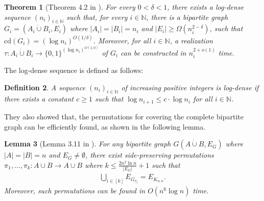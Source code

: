 \documentclass[10pt,a4paper]{article}
\newtheorem{theorem}{Theorem}
\newtheorem{lemma}[theorem]{Lemma}
\newtheorem{definition}[theorem]{Definition}
\newcommand{\N}{\mathbb{N}}
\begin{document}
\begin{theorem}[Theorem 4.2 in \cite{r29}] \label{thm:dense-cd}
For every $0<\delta < 1$, there exists a log-dense sequence $(n_i)_{i\in \N}$ such that, for every $i\in \N$, there is a bipartite graph $G_i=(A_i \dot \cup B_i, E_i)$ where $|A_i|=|B_i|=n_i$ and $|E_i|\ge \Omega(n_i^{2-\delta})$, such that $\mathrm{cd}(G_i)=(\log n_i)^{O(1/\delta)}$. Moreover, for all $i\in \N$, a realization $\tau:A_i\dot \cup B_i\rightarrow \{0,1\}^{(\log n_i)^{O(1/\delta)}}$ of $G_i$ can be constructed in $n_i^{2+o(1)}$ time.
\end{theorem}
\noindent The log-dense sequence is defined as follows:
\begin{definition}
A sequence $(n_i)_{i\in \N}$ of increasing positive integers is log-dense if there exists a constant $c\ge 1$ such that $\log n_{i+1}\le c\cdot \log n_i$ for all $i\in \N$.
\end{definition}
They also showed that, the permutations for covering the complete bipartite graph can be efficiently found, as shown in the following lemma.
\begin{lemma}[Lemma 3.11 in \cite{r29}] \label{lem:cover}
For any bipartite graph $G(A\dot \cup B, E_G)$ where $|A|=|B|=n$ and $E_G\ne \emptyset$, there exist side-preserving permutations $\pi_1,\dots, \pi_k:A\cup B\rightarrow A\cup B$ where $k\leq \frac{2n^2\ln n}{|E_G|}+1$ such that
\begin{align}
    \underset{i\in [k]}{\bigcup} E_{G_{\pi_i}} = E_{K_{n,n}}.
\end{align}
Moreover, such permutations can be found in $O(n^6\log n)$ time.
\end{lemma}
\end{document}
